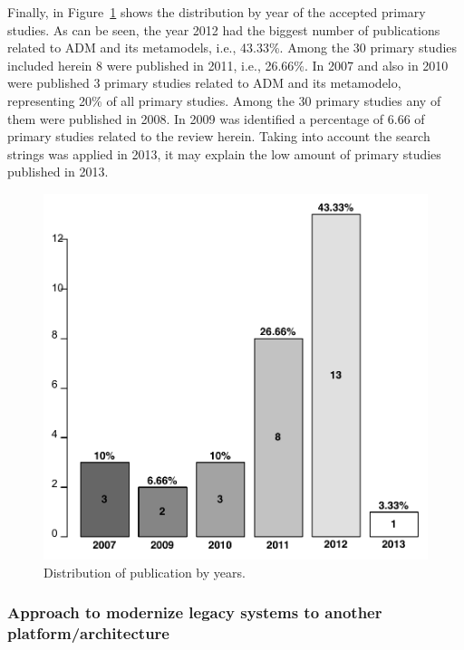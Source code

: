 Finally, in Figure~\ref{fig:distribuicao_de_artigo_por_ano} shows the distribution by year of the accepted primary studies. As can be seen, the year 2012 had the biggest number of publications related to ADM and its metamodels, i.e., 43.33\%. Among the 30 primary studies included herein 8 were published in 2011, i.e., 26.66\%. In 2007 and also in 2010 were published 3 primary studies related to ADM and its metamodelo, representing 20\% of all primary studies. Among the 30 primary studies any of them were published in 2008. In 2009 was identified a percentage of 6.66 of primary studies related to the review herein. Taking into account the search strings was applied in 2013, it may explain the low amount of primary studies published in 2013. 

 \begin{figure}[!h]
 \centering
   \includegraphics[scale=0.4]{figuras/DistribuicaoANoArtigos}
 \caption{Distribution of publication by years.}
 \label{fig:distribuicao_de_artigo_por_ano}
\end{figure} 


\subsubsection{Approach to modernize legacy systems to another platform/architecture} %
\label{ssub:approach}


